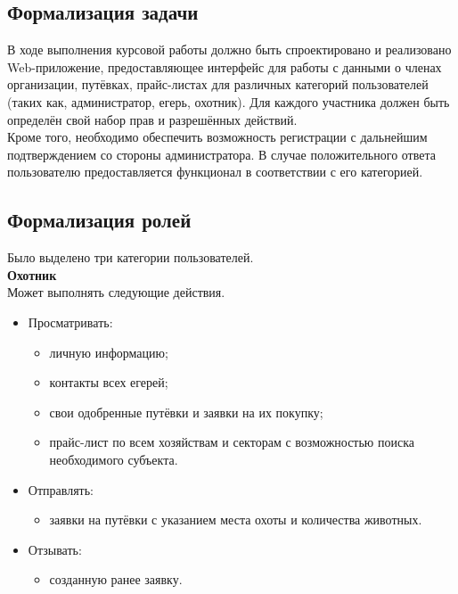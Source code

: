 	\subsection{Формализация задачи}
	В ходе выполнения курсовой работы должно быть спроектировано и реализовано Web-приложение, предоставляющее интерфейс для работы с данными о членах организации, путёвках, прайс-листах для различных категорий пользователей (таких как, администратор, егерь, охотник). Для каждого участника должен быть определён свой набор прав и разрешённых действий.\\
	
	Кроме того, необходимо обеспечить возможность регистрации с дальнейшим подтверждением со стороны администратора. В случае положительного ответа пользователю предоставляется функционал в соответствии с его категорией.
	
	\subsection{Формализация ролей}
	Было выделено три категории пользователей.\\
	
	\textbf{Охотник} \\
		Может выполнять следующие действия.
		\begin{itemize}
			\item Просматривать:
			\begin{itemize}
				\item личную информацию;
				\item контакты всех егерей;
				\item свои одобренные путёвки и заявки на их покупку;
				\item прайс-лист по всем хозяйствам и секторам с возможностью поиска необходимого субъекта.
			\end{itemize}
			\item Отправлять:
			\begin{itemize} 
			 	\item заявки на путёвки с указанием места охоты и количества животных.
			\end{itemize}
		 	\item Отзывать:
		 	\begin{itemize}
		 		\item созданную ранее заявку.
		 	\end{itemize}
		\end{itemize}
	
